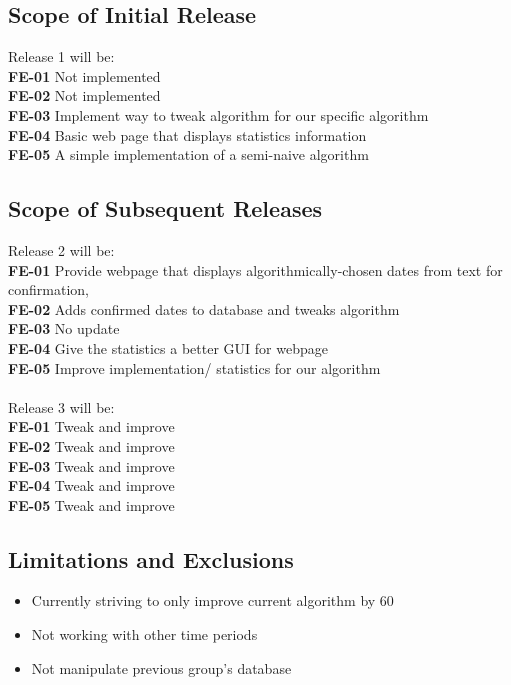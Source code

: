 \documentclass[11pt]{article}
\begin{document}
\subsection{Scope of Initial Release}
Release 1 will be: \\
\textbf{FE-01} Not implemented \\
\textbf{FE-02} Not implemented \\
\textbf{FE-03} Implement way to tweak algorithm for our specific algorithm \\
\textbf{FE-04} Basic web page that displays statistics information \\
\textbf{FE-05} A simple implementation of a semi-naive algorithm

\subsection{Scope of Subsequent Releases}
Release 2 will be: \\
\textbf{FE-01} Provide webpage that displays algorithmically-chosen dates from text for confirmation, \\
\textbf{FE-02} Adds confirmed dates to database and tweaks algorithm \\
\textbf{FE-03} No update \\
\textbf{FE-04} Give the statistics a better GUI for webpage \\
\textbf{FE-05} Improve implementation/ statistics for our algorithm \\
 \\
Release 3 will be: \\
\textbf{FE-01} Tweak and improve \\
\textbf{FE-02} Tweak and improve \\
\textbf{FE-03} Tweak and improve \\
\textbf{FE-04} Tweak and improve \\
\textbf{FE-05} Tweak and improve

\subsection{Limitations and Exclusions}
\begin{itemize}
    \item Currently striving to only improve current algorithm by 60%
    \item Not working with other time periods
    \item Not manipulate previous group's database
\end{itemize}
\end{document}
